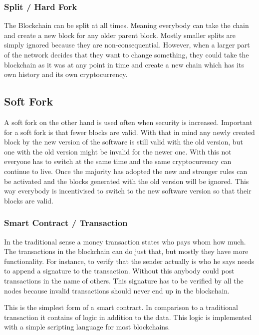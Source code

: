 \documentclass[a4paper, 11pt]{scrartcl}
\begin{document}
\subsubsection{Split / Hard Fork}

The Blockchain can be split at all times.
Meaning everybody can take the chain and create a new block for any older parent block.
Mostly smaller splits are simply ignored because they are non-consequential.
However, when a larger part of the network decides that they want to change something, they could take the blockchain as it was at any point in time and create a new chain which has its own history and its own cryptocurrency. \cite{blockchainKai}

\subsection{Soft Fork}

A soft fork on the other hand is used often when security is increased. Important for a soft fork is that fewer blocks are valid. With that in mind any newly created block by the new version of the software is still valid with the old version, but one with the old version might be invalid for the newer one. With this not everyone has to switch at the same time and the same cryptocurrency can continue to live. Once the majority has adopted the new and stronger rules can be activated and the blocks generated with the old version will be ignored. This way everybody is incentivised to switch to the new software version so that their blocks are valid. \cite{blockchainKai}

\subsubsection{Smart Contract / Transaction}

In the traditional sense a money transaction states who pays whom how much.
The transactions in the blockchain can do just that, but mostly they have more functionality.
For instance, to verify that the sender actually is who he says needs to append a signature to the transaction.
Without this anybody could post transactions in the name of others.
This signature has to be verified by all the nodes because invalid transactions should never end up in the blockchain. \cite{blockchainKai}

This is the simplest form of a smart contract.
In comparison to a traditional transaction it contains of logic in addition to the data.
This logic is implemented with a simple scripting language for most blockchains. \cite{blockchainKai}
\end{document}
